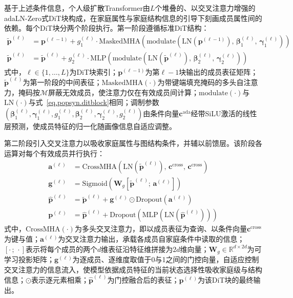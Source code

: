 基于上述条件信息，个人级扩散Transformer由$L$个堆叠的、以交叉注意力增强的adaLN-Zero式DiT块构成，在家庭属性与家庭结构信息的引导下刻画成员属性间的依赖。每个DiT块分两个阶段执行。第一阶段遵循标准DiT结构：
\begin{equation}
  \begin{aligned}
    \tilde{\mathbf{p}}^{(\ell)} &= \mathbf{p}^{(\ell-1)} + g_1^{(\ell)} \cdot \mathrm{MaskedMHA}\left(\mathrm{modulate}\left(\mathrm{LN}(\mathbf{p}^{(\ell-1)}),\, \boldsymbol{\beta}_1^{(\ell)},\, \boldsymbol{\gamma}_1^{(\ell)}\right)\right) \\
    \tilde{\mathbf{p}}^{(\ell)} &= \tilde{\mathbf{p}}^{(\ell)} + g_2^{(\ell)} \cdot \mathrm{MLP}\left(\mathrm{modulate}\left(\mathrm{LN}(\tilde{\mathbf{p}}^{(\ell)}),\, \boldsymbol{\beta}_2^{(\ell)},\, \boldsymbol{\gamma}_2^{(\ell)}\right)\right)
  \end{aligned}
  \label{eq.popsyn.indstage1}
\end{equation}
式中，$\ell \in \{1, \ldots, L\}$为DiT块索引；$\mathbf{p}^{(\ell-1)}$为第$\ell-1$块输出的成员表征矩阵；$\tilde{\mathbf{p}}^{(\ell)}$为第一阶段的中间表征；$\mathrm{MaskedMHA}(\cdot)$为带键端填充掩码的多头自注意力，掩码按$\mathcal{M}$屏蔽无效成员，使注意力仅在有效成员间计算；$\mathrm{modulate}(\cdot)$与$\mathrm{LN}(\cdot)$与式~\eqref{eq.popsyn.ditblock}相同；调制参数$(\boldsymbol{\beta}_1^{(\ell)}, \boldsymbol{\gamma}_1^{(\ell)}, g_1^{(\ell)}, \boldsymbol{\beta}_2^{(\ell)}, \boldsymbol{\gamma}_2^{(\ell)}, g_2^{(\ell)})$由条件向量$\mathbf{c}^{\mathrm{ada}}$经带SiLU激活的线性层预测，使成员特征的归一化随画像信息自适应调整。
 
第二阶段引入交叉注意力以吸收家庭属性与图结构条件，并辅以前馈层。该阶段各运算对每个有效成员并行执行：
\begin{equation}
  \begin{aligned}
    \mathbf{a}^{(\ell)} &= \mathrm{CrossMHA}\left(\mathrm{LN}(\tilde{\mathbf{p}}^{(\ell)}),\, \mathbf{c}^{\mathrm{cross}},\, \mathbf{c}^{\mathrm{cross}}\right) \\
    \mathbf{g}^{(\ell)} &= \mathrm{Sigmoid}\left(\mathbf{W}_g \left[\tilde{\mathbf{p}}^{(\ell)};\, \mathbf{a}^{(\ell)}\right]\right) \\
    \hat{\mathbf{p}}^{(\ell)} &= \tilde{\mathbf{p}}^{(\ell)} + \mathbf{g}^{(\ell)} \odot \mathrm{Dropout}\left(\mathbf{a}^{(\ell)}\right) \\
    \mathbf{p}^{(\ell)} &= \hat{\mathbf{p}}^{(\ell)} + \mathrm{Dropout}\left(\mathrm{MLP}\left(\mathrm{LN}(\hat{\mathbf{p}}^{(\ell)})\right)\right)
  \end{aligned}
  \label{eq.popsyn.indstage2}
\end{equation}
式中，$\mathrm{CrossMHA}(\cdot)$为多头交叉注意力，即以成员表征为查询、以条件向量$\mathbf{c}^{\mathrm{cross}}$为键与值；$\mathbf{a}^{(\ell)}$为交叉注意力输出，承载各成员自家庭条件中读取的信息；$[\cdot\,;\,\cdot]$表示将每个成员的两个$d$维表征沿特征维拼接为$2d$维向量；$\mathbf{W}_g \in \mathbb{R}^{d \times 2d}$为可学习投影矩阵；$\mathbf{g}^{(\ell)}$为逐成员、逐维度取值于0与1之间的门控向量，自适应控制交叉注意力的信息流入，使模型依据成员特征的当前状态选择性吸收家庭级与结构信息；$\odot$表示逐元素相乘；$\hat{\mathbf{p}}^{(\ell)}$为门控融合后的表征；$\mathbf{p}^{(\ell)}$为该DiT块的最终输出。
 
